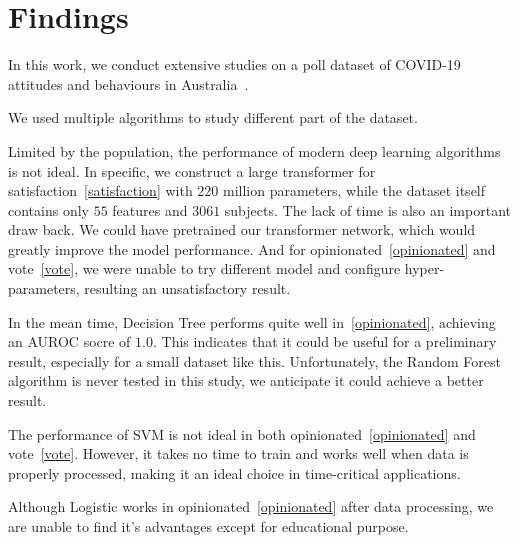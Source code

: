 \documentclass[11pt,twocolumn,letterpaper]{article}
\begin{document}
\section{Findings}

In this work, we conduct extensive studies on a poll dataset of COVID-19 attitudes and behaviours in Australia~\cite{data}.

We used multiple algorithms to study different part of the dataset.

Limited by the population, the performance of modern deep learning algorithms is not ideal.
In specific, we construct a large transformer for satisfaction~\ref{satisfaction} with $220$ million parameters, while the dataset itself contains only $55$ features and $3061$ subjects.
The lack of time is also an important draw back.
We could have pretrained our transformer network, which would greatly improve the model performance.
And for opinionated~\ref{opinionated} and vote~\ref{vote}, we were unable to try different model and configure hyper-parameters, resulting an unsatisfactory result.

In the mean time, Decision Tree performs quite well in~\ref{opinionated}, achieving an AUROC socre of $1.0$.
This indicates that it could be useful for a preliminary result, especially for a small dataset like this.
Unfortunately, the Random Forest algorithm is never tested in this study, we anticipate it could achieve a better result.

The performance of SVM is not ideal in both opinionated~\ref{opinionated} and vote~\ref{vote}.
However, it takes no time to train and works well when data is properly processed,
making it an ideal choice in time-critical applications.

Although Logistic works in opinionated~\ref{opinionated} after data processing, we are unable to find it's advantages except for educational purpose.

{\small


}
\end{document}
